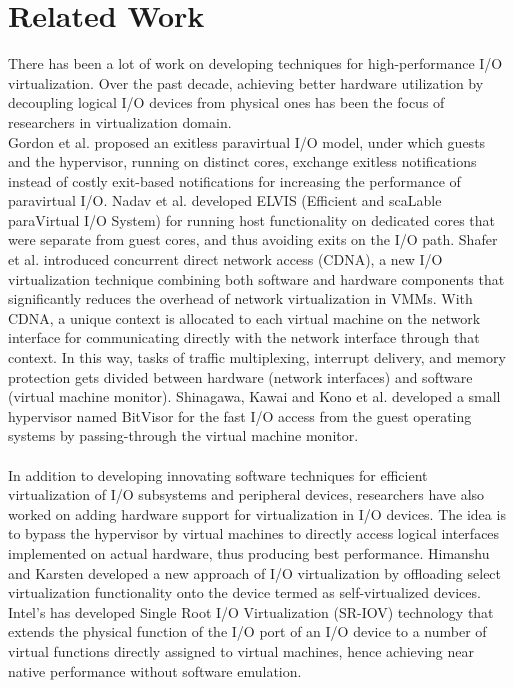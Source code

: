 \section{Related Work\label{sec:prework}}
There has been a lot of work on developing techniques for high-performance I/O virtualization. Over the past decade, achieving better hardware utilization by decoupling logical I/O devices from physical ones has been the focus of researchers in virtualization domain.
\\
Gordon et al. \cite{exitless} proposed an exitless paravirtual I/O model, under which guests and the hypervisor, running on distinct cores, exchange exitless notifications instead of costly exit-based notifications for increasing the performance of paravirtual I/O. Nadav et al. \cite{efficient}  developed ELVIS (Efficient and scaLable paraVirtual I/O System) for running host functionality on dedicated cores that were separate from guest cores, and thus avoiding exits on the I/O path. Shafer et al. \cite{CDNA} introduced concurrent direct network access (CDNA), a new I/O virtualization technique combining both software and hardware components that significantly reduces the overhead of network virtualization in VMMs. With CDNA, a unique context is allocated to each virtual machine on the network interface for communicating directly with the network interface through that context. In this way, tasks of traffic multiplexing, interrupt delivery, and memory protection gets divided between hardware (network interfaces) and software (virtual  machine monitor). Shinagawa, Kawai and Kono et al. \cite{bitvisor} developed a small hypervisor named BitVisor for the fast I/O access from the guest operating systems by passing-through the virtual machine monitor.
\\
\\
In addition to developing innovating software techniques for efficient virtualization of I/O subsystems and peripheral devices, researchers have also worked on adding hardware support for virtualization in I/O devices. The idea is to bypass the hypervisor by virtual machines to directly access logical interfaces implemented on actual hardware, thus producing best performance. Himanshu and Karsten \cite{selfvirt} developed a new approach of I/O virtualization by offloading select virtualization functionality onto the device termed as self-virtualized devices. Intel's has developed Single Root I/O Virtualization (SR-IOV) technology \cite{SRIOC} that extends the physical function of the I/O port of an I/O device to a number of virtual functions directly assigned to virtual machines, hence achieving near native performance without software emulation. 
